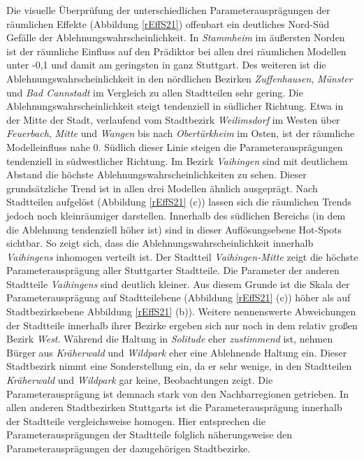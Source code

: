 \documentclass{Vorlage}
\begin{document}
Die visuelle Überprüfung der unterschiedlichen Parameterausprägungen der räumlichen Effekte (Abbildung \ref{rEffS21}) offenbart ein deutliches Nord-Süd Gefälle der Ablehnungswahrscheinlichkeit. In \textit{Stammheim} im äußersten Norden ist der räumliche Einfluss auf den Prädiktor bei allen drei räumlichen Modellen unter -0,1 und damit am geringsten in ganz Stuttgart. Des weiteren ist die Ablehnungswahrscheinlichkeit in den nördlichen Bezirken \textit{Zuffenhausen}, \textit{Münster} und \textit{Bad Cannstadt} im Vergleich zu allen Stadtteilen sehr gering. Die Ablehnungswahrscheinlichkeit steigt tendenziell in südlicher Richtung. Etwa in der Mitte der Stadt, verlaufend vom Stadtbezirk \textit{Weilimsdorf} im Westen über \textit{Feuerbach}, \textit{Mitte} und \textit{Wangen} bis nach \textit{Obertürkheim} im Osten, ist der räumliche Modelleinfluss nahe 0. Südlich dieser Linie steigen die Parameterausprägungen tendenziell in südwestlicher Richtung. Im Bezirk \textit{Vaihingen} sind mit deutlichem Abstand die höchste Ablehnungswahrscheinlichkeiten zu sehen. Dieser grundsätzliche Trend ist in allen drei Modellen ähnlich ausgeprägt. Nach Stadtteilen aufgelöst (Abbildung \ref{rEffS21} (c)) lassen sich die räumlichen Trends jedoch noch kleinräumiger darstellen. Innerhalb des südlichen Bereichs (in dem die Ablehnung tendenziell höher ist) sind in dieser Auflösungsebene Hot-Spots sichtbar. So zeigt sich, dass die Ablehnungswahrscheinlichkeit innerhalb \textit{Vaihingens} inhomogen verteilt ist. Der Stadtteil \textit{Vaihingen-Mitte} zeigt die höchste Parameterausprägung aller Stuttgarter Stadtteile. Die Parameter der anderen Stadtteile \textit{Vaihingens} sind deutlich kleiner. Aus diesem Grunde ist die Skala der Parameterausprägung auf Stadtteilebene (Abbildung \ref{rEffS21} (c)) höher als auf Stadtbezirksebene Abbildung \ref{rEffS21} (b)). Weitere nennenswerte Abweichungen der Stadtteile innerhalb ihrer Bezirke ergeben sich nur noch in dem relativ großen Bezirk \textit{West}. Während die Haltung in \textit{Solitude} eher \textit{zustimmend} ist, nehmen Bürger aus \textit{Kräherwald} und \textit{Wildpark} eher eine Ablehnende Haltung ein. Dieser Stadtbezirk nimmt eine Sonderstellung ein, da er sehr wenige, in den Stadtteilen \textit{Kräherwald} und \textit{Wildpark} gar keine, Beobachtungen zeigt. Die Parameterausprägung ist demnach stark von den Nachbarregionen getrieben. In allen anderen Stadtbezirken Stuttgarts ist die Parameterausprägung innerhalb der Stadtteile vergleichsweise homogen. Hier entsprechen die Parameterausprägungen der Stadtteile folglich näherungsweise den Parameterausprägungen der dazugehörigen Stadtbezirke.\\
\end{document}
